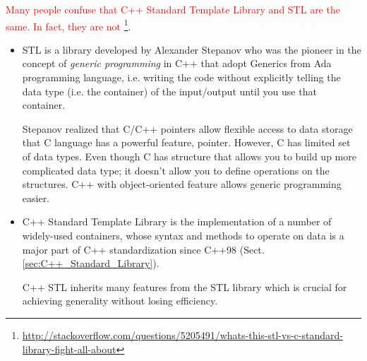 \textcolor{red}{Many people confuse that C++ Standard Template Library and STL
are the same. In fact, they are not}
\footnote{\url{http://stackoverflow.com/questions/5205491/whats-this-stl-vs-c-standard-library-fight-all-about}}.
\begin{itemize}
  \item STL is a library developed by Alexander Stepanov who was the pioneer in the
concept of {\it generic programming} in C++ that adopt Generics from Ada
programming language, i.e. writing the code without explicitly telling the data
type (i.e. the container) of the input/output until you use that container.

Stepanov realized that C/C++ pointers allow flexible access to data storage that
C language has a powerful feature, pointer. However, C has limited set of data
types. Even though C has structure that allows you to build up more complicated
data type; it doesn't allow you to define operations on the structures. C++ with
object-oriented feature allows generic programming easier.

  \item C++ Standard Template Library is the implementation of a number of widely-used containers,
  whose syntax and methods to operate on data is  a major part
  of C++ standardization since C++98 (Sect.\ref{sec:C++_Standard_Library}).
  
  C++ STL  inherits many features from the STL library  which is crucial for
  achieving generality without losing efficiency.

\end{itemize}

